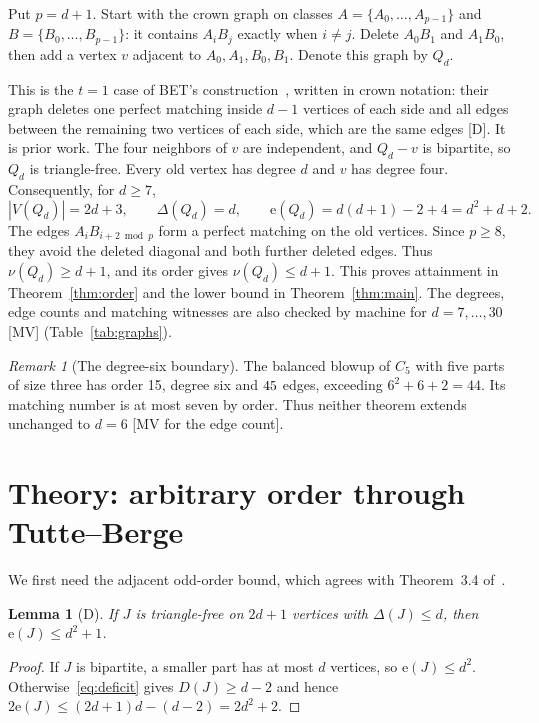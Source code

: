 \documentclass[11pt]{article}
\newtheorem{lemma}[theorem]{Lemma}
\theoremstyle{remark}
\newtheorem{remark}[theorem]{Remark}
\newcommand{\e}{\mathrm{e}}
\begin{document}
Put $p=d+1$. Start with the crown graph on classes $A=\{A_0,\ldots,A_{p-1}\}$ and $B=\{B_0,\ldots,B_{p-1}\}$: it contains $A_iB_j$ exactly when $i\ne j$. Delete $A_0B_1$ and $A_1B_0$, then add a vertex $v$ adjacent to $A_0,A_1,B_0,B_1$. Denote this graph by $Q_d$.

This is the $t=1$ case of BET's construction~\cite[Proposition 4.1]{BET}, written in crown notation: their graph deletes one perfect matching inside $d-1$ vertices of each side and all edges between the remaining two vertices of each side, which are the same edges [D]. It is prior work. The four neighbors of $v$ are independent, and $Q_d-v$ is bipartite, so $Q_d$ is triangle-free. Every old vertex has degree $d$ and $v$ has degree four. Consequently, for $d\ge7$,
\begin{equation}\label{eq:attain}
|V(Q_d)|=2d+3,\qquad \Delta(Q_d)=d,\qquad
\e(Q_d)=d(d+1)-2+4=d^2+d+2.
\end{equation}
The edges $A_iB_{i+2\bmod p}$ form a perfect matching on the old vertices. Since $p\ge8$, they avoid the deleted diagonal and both further deleted edges. Thus $\nu(Q_d)\ge d+1$, and its order gives $\nu(Q_d)\le d+1$.
This proves attainment in Theorem~\ref{thm:order} and the lower bound in Theorem~\ref{thm:main}. The degrees, edge counts and matching witnesses are also checked by machine for $d=7,\ldots,30$ [MV] (Table~\ref{tab:graphs}).

\begin{remark}[The degree-six boundary]
The balanced blowup of $C_5$ with five parts of size three has order 15, degree six and $45$ edges, exceeding $6^2+6+2=44$. Its matching number is at most seven by order. Thus neither theorem extends unchanged to $d=6$ [MV for the edge count].
\end{remark}

\section{Theory: arbitrary order through Tutte--Berge}\label{sec:tb}

We first need the adjacent odd-order bound, which agrees with Theorem~3.4 of~\cite{AEY}.
\begin{lemma}[D]\label{lem:smaller}
If $J$ is triangle-free on $2d+1$ vertices with $\Delta(J)\le d$, then $\e(J)\le d^2+1$.
\end{lemma}
\begin{proof}
If $J$ is bipartite, a smaller part has at most $d$ vertices, so $\e(J)\le d^2$. Otherwise~\eqref{eq:deficit} gives $D(J)\ge d-2$ and hence
$2\e(J)\le(2d+1)d-(d-2)=2d^2+2$.
\end{proof}
\end{document}
